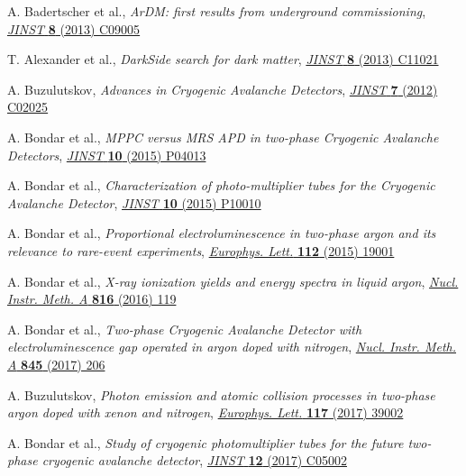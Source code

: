 \documentclass[a4paper,11pt]{article}
\begin{document}
\begin{thebibliography}{99}
A. Badertscher et al., \emph{ArDM: first results from underground commissioning},  \href{https://doi.org/10.1088/1748-0221/8/09/C09005}{\emph{JINST} {\bf 8} (2013) C09005}

T. Alexander et al., \emph{DarkSide search for dark matter},  \href{https://doi.org/10.1088/1748-0221/8/11/C11021}{\emph{JINST} {\bf 8} (2013) C11021}



A. Buzulutskov, \emph{Advances in Cryogenic Avalanche Detectors}, \href{https://doi.org/10.1088/1748-0221/7/02/C02025}{\emph{JINST} {\bf 7} (2012) C02025}

A. Bondar et al., \emph{MPPC versus MRS APD in two-phase Cryogenic Avalanche Detectors}, \href{http://dx.doi.org/10.1088/1748-0221/10/04/P04013}{\emph{JINST} {\bf 10} (2015) P04013}

A. Bondar et al., \emph{Characterization of photo-multiplier tubes for the Cryogenic Avalanche Detector}, \href{http://dx.doi.org/10.1088/1748-0221/10/10/P10010}{\emph{JINST} {\bf 10} (2015) P10010}

A. Bondar et al., \emph{Proportional electroluminescence in two-phase argon and its relevance to rare-event experiments}, \href{http://doi.org/10.1209/0295-5075/112/19001}{\emph{Europhys. Lett.} {\bf 112} (2015) 19001}

A. Bondar et al., \emph{X-ray ionization yields and energy spectra in liquid argon}, \href{http://dx.doi.org/10.1016/j.nima.2016.02.010}{\emph{Nucl. Instr. Meth. A} {\bf 816} (2016) 119}

A. Bondar et al., \emph{Two-phase Cryogenic Avalanche Detector with electroluminescence gap operated in argon doped with nitrogen}, \href{http://dx.doi.org/10.1016/j.nima.2016.05.109}{\emph{Nucl. Instr. Meth. A} {\bf 845} (2017) 206}

A. Buzulutskov, \emph{Photon emission and atomic collision processes in two-phase argon doped with xenon and nitrogen}, \href{http://doi.org/10.1209/0295-5075/117/39002}{\emph{Europhys. Lett.} {\bf 117} (2017) 39002}

A. Bondar et al., \emph{Study of cryogenic photomultiplier tubes for the future two-phase cryogenic avalanche detector}, \href{http://doi.org/10.1088/1748-0221/12/05/C05002}{\emph{JINST} {\bf 12} (2017) C05002}


\end{thebibliography}
\end{document}
